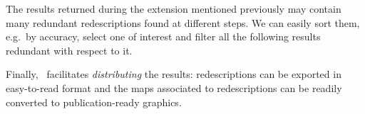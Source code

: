 \label{sec:filt-redund-redescr}
The results returned during the extension
mentioned previously may contain many redundant redescriptions found
at different steps. We can easily sort them, e.g.\ by accuracy, select
one of interest and filter all the following results redundant with respect to it.

\label{sec:sharing-results}
Finally, \Siren\ facilitates \emph{distributing} the results:
redescriptions can be exported in easy-to-read format and the
maps associated to redescriptions can be readily converted to
publication-ready graphics. 

